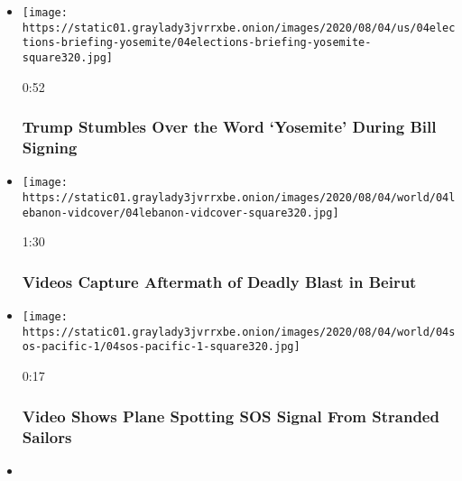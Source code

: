 \begin{itemize}
\item
  \href{https://www.nytimes3xbfgragh.onion/video/us/100000007272140/trump-stumbles-over-yosemite.html?action=click\&module=video-series-bar\&region=header\&pgtype=Article\&playlistId=video/latest-video}{}

  \texttt{[image: https://static01.graylady3jvrrxbe.onion/images/2020/08/04/us/04elections-briefing-yosemite/04elections-briefing-yosemite-square320.jpg]}

  0:52

  \hypertarget{trump-stumbles-over-the-word-yosemite-during-bill-signing}{%
  \subsubsection{Trump Stumbles Over the Word `Yosemite' During Bill
  Signing}\label{trump-stumbles-over-the-word-yosemite-during-bill-signing}}
\item
  \href{https://www.nytimes3xbfgragh.onion/video/world/100000007272075/lebanon-beirut-blast.html?action=click\&module=video-series-bar\&region=header\&pgtype=Article\&playlistId=video/latest-video}{}

  \texttt{[image: https://static01.graylady3jvrrxbe.onion/images/2020/08/04/world/04lebanon-vidcover/04lebanon-vidcover-square320.jpg]}

  1:30

  \hypertarget{videos-capture-aftermath-of-deadly-blast-in-beirut}{%
  \subsubsection{Videos Capture Aftermath of Deadly Blast in
  Beirut}\label{videos-capture-aftermath-of-deadly-blast-in-beirut}}
\item
  \href{https://www.nytimes3xbfgragh.onion/video/world/100000007271927/pacific-island-rescue-video.html?action=click\&module=video-series-bar\&region=header\&pgtype=Article\&playlistId=video/latest-video}{}

  \texttt{[image: https://static01.graylady3jvrrxbe.onion/images/2020/08/04/world/04sos-pacific-1/04sos-pacific-1-square320.jpg]}

  0:17

  \hypertarget{video-shows-plane-spotting-sos-signal-from-stranded-sailors}{%
  \subsubsection{Video Shows Plane Spotting SOS Signal From Stranded
  Sailors}\label{video-shows-plane-spotting-sos-signal-from-stranded-sailors}}
\item
  \href{https://www.nytimes3xbfgragh.onion/video/us/100000007271780/wyoming-hot-air-balloon-crash.html?action=click\&module=video-series-bar\&region=header\&pgtype=Article\&playlistId=video/latest-video}{}


\end{itemize}
